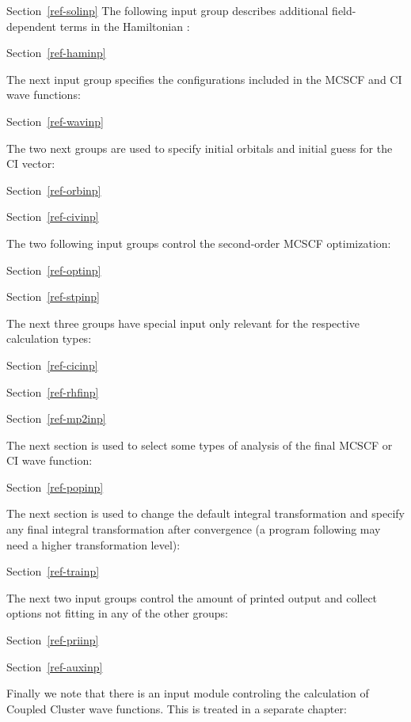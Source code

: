 Section~\ref{ref-solinp} 
\else
The following input group describes additional field-dependent
terms in the Hamiltonian :

Section~\ref{ref-haminp} 
\fi

\noindent
The next input group specifies the configurations included
in the MCSCF and CI wave functions:

Section~\ref{ref-wavinp} 

\noindent
The two next groups are used to specify initial orbitals and initial
guess for the CI vector:

Section~\ref{ref-orbinp} 

Section~\ref{ref-civinp} 

\noindent
The two following input groups control the second-order MCSCF
optimization:

Section~\ref{ref-optinp} 

Section~\ref{ref-stpinp} 

\noindent
The next three groups have special input only relevant for the
respective calculation types:

Section~\ref{ref-cicinp} 

Section~\ref{ref-rhfinp} 

Section~\ref{ref-mp2inp} 

\noindent
The next section is used to select some types of analysis of the final
MCSCF or CI wave function:

Section~\ref{ref-popinp} 

\noindent
The next section is used to change the default integral transformation
and specify any final integral transformation after convergence (a
program following {\sir} may need a higher transformation level):

Section~\ref{ref-trainp} 

\noindent
The next two input groups control the amount of printed output and
collect options not fitting in any of the other groups:

Section~\ref{ref-priinp} 

Section~\ref{ref-auxinp} 

\noindent
Finally we note that there is an input module controling the
calculation of Coupled Cluster wave functions. This is treated in a
separate chapter:

